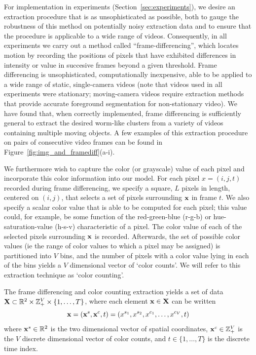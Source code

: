 \documentclass[twocolumn, final]{svjour3}
\begin{document}
For implementation in experiments (Section~\ref{sec:experiments}), we desire an extraction procedure that is as unsophisticated as possible, both to gauge the robustness of this method on potentially noisy extraction data and to ensure that the procedure is applicable to a wide range of videos. Consequently, in all experiments we carry out a method called ``frame-differencing'', which locates motion by recording the positions of pixels that have exhibited differences in intensity or value in succesive frames beyond a given threshold. Frame differencing is unsophisticated, computationally inexpensive, able to be applied to a wide range of static, single-camera videos (note that videos used in all experiments were stationary; moving-camera videos require extraction methods that provide accurate foreground segmentation for non-stationary video). We have found that, when correctly implemented, frame differencing is sufficiently general to extract the desired worm-like clusters from a variety of videos containing multiple moving objects. A few examples of this extraction procedure on pairs of consecutive video frames can be found in Figure~\ref{fig:img_and_framediff}(a-i).

We furthermore wish to capture the color (or grayscale) value of each pixel and incorporate this color information into our model. For each pixel $x = (i, j, t)$ recorded during frame differencing, we specify a square, $L$ pixels in length, centered on $(i, j)$, that selects a set of pixels surrounding $\bold{x}$ in frame $t$. We also specify a scalar color value that is able to be computed for each pixel; this value could, for example, be some function of the red-green-blue (r-g-b) or hue-saturation-value (h-s-v) characteristic of a pixel. The color value of each of the selected pixels surrounding $\bold{x}$ is recorded. Afterwards, the set of possible color values (ie the range of color values to which a pixel may be assigned) is partitioned into $V$ bins, and the number of pixels with a color value lying in each of the bins yields a $V$ dimensional vector of `color counts'. We will refer to this extraction technique as `color counting'.

The frame differencing and color counting extraction yields a set of data $\bold{X} \subset \mathbb{R}^{2} \times \mathbb{Z}_{+}^{V} \times \{1, \ldots, T \}$, where each element $\bold{x} \in \bold{X}$ can be written
\begin{equation}
\bold{x} = ( \bold{x}^{s}, \bold{x}^{c}, t ) = ( x^{s_{1}}, x^{s_{2}}, x^{c_{1}}, \ldots, x^{c_{V}}, t )
\end{equation}
where $\bold{x}^{s} \in \mathbb{R}^{2}$ is the two dimensional vector of spatial coordinates,  $\bold{x}^{c} \in \mathbb{Z}_{+}^{V}$ is the $V$ discrete dimensional vector of color counts, and $t \in \{1, \ldots, T \}$ is the discrete time index. 
\end{document}
